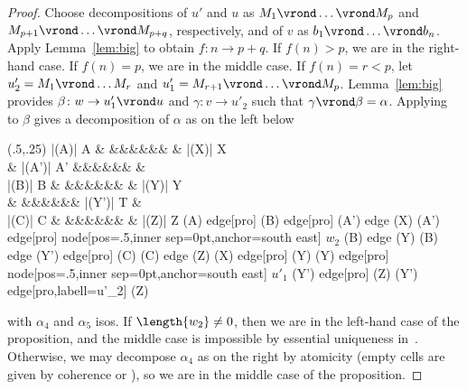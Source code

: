 \documentclass{LMCS}
\theoremstyle{plain}\newtheorem{satz}[thm]{Satz}
\begin{document}
\begin{proof}
  Choose decompositions of $u'$ and $u$ as $M_1 \vrond \ldots \vrond
  M_p$ and $M_{p+1} \vrond \ldots \vrond M_{p+q}$, respectively, and
  of $v$ as $b_1 \vrond \ldots \vrond b_n$. Apply Lemma~\ref{lem:big}
  to obtain $f \colon n \to p+q$. If $f(n) > p$, we are in the
  right-hand case.  If $f(n) = p$, we are in the middle case. If $f(n)
  = r < p$, let $u'_2 = M_1 \vrond \ldots M_r$ and $u'_1 =
  M_{r+1}\vrond \ldots \vrond M_p$.  Lemma~\ref{lem:big} provides
  $\beta \colon w \to u'_1 \vrond u$ and $\gamma \colon v \to u'_2$
  such that $\gamma \vrond \beta = \alpha$.
  Applying~ to $\beta$ gives a decomposition
  of $\alpha$ as on the left below
  \begin{center}
    \Diag (.5,.25) {     }{|(A)| A \& \&\&\&\&\&\& \& |(X)| X \\
        \& |(A')| A' \&\&\&\&\&\& \&  \\
        |(B)| B \& \&\&\&\&\&\& \& |(Y)| Y \\
        \& \&\&\&\&\&\& |(Y')| T \&  \\
        |(C)| C \& \&\&\&\&\&\& \& |(Z)| Z }{(A) edge[pro] (B) edge[pro] (A') edge (X) (A') edge[pro] node[pos=.5,inner sep=0pt,anchor=south east]
        {$\scriptstyle w_2$} (B) edge (Y) (B) edge (Y') edge[pro] (C) (C) edge (Z) (X) edge[pro] (Y) (Y) edge[pro] node[pos=.5,inner sep=0pt,anchor=south east]
        {$\scriptstyle u'_1$} (Y') edge[pro] (Z) (Y') edge[pro,labell={u'_2}] (Z) }
\hfil
\end{center}
with $\alpha_4$ and $\alpha_5$ isos. If $\length{w_2} \neq 0$, then we
are in the left-hand case of the proposition, and the middle case is
impossible by essential uniqueness
in~. Otherwise, we may decompose $\alpha_4$
as on the right by atomicity (empty cells are given by coherence or
), so we are in the middle case of the proposition.
\end{proof}
\end{document}
